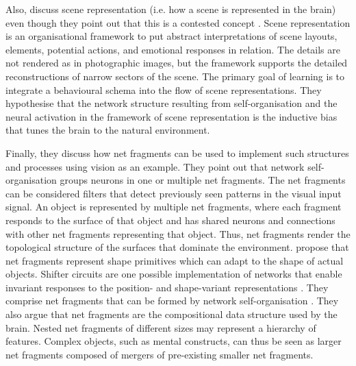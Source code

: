 Also,  discuss scene representation (i.e. how a scene is represented in the brain) even though they point out that this is a contested concept .
Scene representation is an organisational framework to put abstract interpretations of scene layouts, elements, potential actions, and emotional responses in relation.
The details are not rendered as in photographic images, but the framework supports the detailed reconstructions of narrow sectors of the scene.
The primary goal of learning is to integrate a behavioural schema into the flow of scene representations.
They hypothesise that the network structure resulting from self-organisation and the neural activation in the framework of scene representation is the inductive bias that tunes the brain to the natural environment.

Finally, they discuss how net fragments can be used to implement such structures and processes using vision as an example.
They point out that network self-organisation groups neurons in one or multiple net fragments.
The net fragments can be considered filters that detect previously seen patterns in the visual input signal.
An object is represented by multiple net fragments, where each fragment responds to the surface of that object and has shared neurons and connections with other net fragments representing that object.
Thus, net fragments render the topological structure of the surfaces that dominate the environment.
 propose that net fragments represent shape primitives which can adapt to the shape of actual objects.
Shifter circuits are one possible implementation of networks that enable invariant responses to the position- and shape-variant representations .
They comprise net fragments that can be formed by network self-organisation .
They also argue that net fragments are the compositional data structure used by the brain.
Nested net fragments of different sizes may represent a hierarchy of features.
Complex objects, such as mental constructs, can thus be seen as larger net fragments composed of mergers of pre-existing smaller net fragments.

